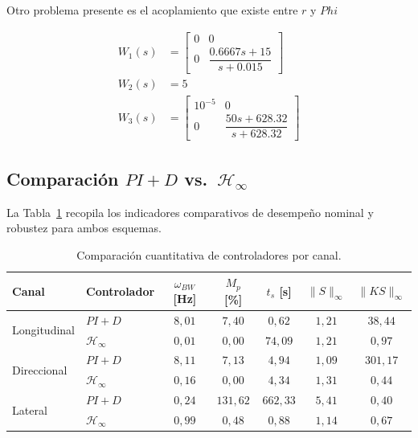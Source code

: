 \documentclass[11pt,letterpaper]{article}
\numberwithin{equation}{section}
\begin{document}
Otro problema presente es el acoplamiento que existe entre $r$ y $Phi$ 

\begin{align}
W_1(s) &= \begin{bmatrix} 0 & 0 \\[4pt] 0 & \dfrac{0.6667 s + 15}{s + 0.015} \end{bmatrix} \\[10pt]
W_2(s) &= 5 \\[10pt]
W_3(s) &= \begin{bmatrix} 10^{-5} & 0 \\[4pt] 0 & \dfrac{50 s + 628.32}{s + 628.32} \end{bmatrix}
\end{align}







\subsection{Comparaci\'on \texorpdfstring{$PI+D$ vs.\ $\mathcal{H}_\infty$}{PI+D vs. H-infinito}}

La Tabla~\ref{tab:comparacion} recopila los indicadores comparativos de desempe\~no nominal y robustez para ambos esquemas.

\begin{table}[H]
  \centering
  \caption{Comparaci\'on cuantitativa de controladores por canal.}
  \label{tab:comparacion}
  \renewcommand{\arraystretch}{1.2}
  \small
  \begin{tabular}{llccccc}
    \toprule
    \textbf{Canal} & \textbf{Controlador}
      & $\omega_{BW}$ [Hz]
      & $M_p$ [\%]
      & $t_s$ [s]
      & $\|S\|_\infty$
      & $\|KS\|_\infty$ \\
    \midrule
    \multirow{2}{*}{Longitudinal}
      & $PI+D$              & $8{,}01$ & $7{,}40$  & $0{,}62$  & $1{,}21$ & $38{,}44$ \\
      & $\mathcal{H}_\infty$ & $0{,}01$ & $0{,}00$  & $74{,}09$ & $1{,}21$ & $0{,}97$ \\
    \midrule
    \multirow{2}{*}{Direccional}
      & $PI+D$              & $8{,}11$ & $7{,}13$  & $4{,}94$  & $1{,}09$ & $301{,}17$ \\
      & $\mathcal{H}_\infty$ & $0{,}16$ & $0{,}00$  & $4{,}34$  & $1{,}31$ & $0{,}44$ \\
    \midrule
    \multirow{2}{*}{Lateral}
      & $PI+D$              & $0{,}24$ & $131{,}62$ & $662{,}33$ & $5{,}41$ & $0{,}40$ \\
      & $\mathcal{H}_\infty$ & $0{,}99$ & $0{,}48$   & $0{,}88$   & $1{,}14$ & $0{,}67$ \\
    \bottomrule
  \end{tabular}
\end{table}
\end{document}
